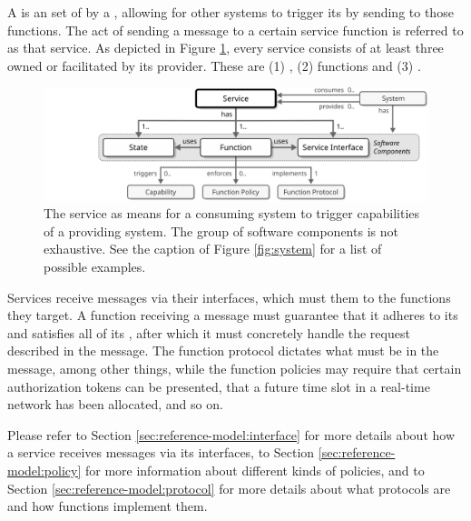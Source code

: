 A  is an  set of   by a , allowing for other systems to trigger its  by sending  to those functions.
The act of sending a message to a certain service function is referred to as  that service.
As depicted in Figure \ref{fig:service}, every service consists of at least three  owned or facilitated by its provider.
These are (1) , (2) functions and (3) .

\begin{figure}[ht!]
  \centering
  \includegraphics[scale=0.9]{figures/service}
  \caption{
    The service as means for a consuming system to trigger capabilities of a providing system.
    The group of software components is not exhaustive.
    See the caption of Figure \ref{fig:system} for a list of possible examples.
  }
  \label{fig:service}
\end{figure}

Services receive messages via their interfaces, which must  them to the functions they target.
A function receiving a message must guarantee that it adheres to its  and satisfies all of its , after which it must concretely handle the request described in the message.
The function protocol dictates what  must be in the message, among other things, while the function policies may require that certain authorization tokens can be presented, that a future time slot in a real-time network has been allocated, and so on.

Please refer to Section \ref{sec:reference-model:interface} for more details about how a service receives messages via its interfaces, to Section \ref{sec:reference-model:policy} for more information about different kinds of policies, and to Section \ref{sec:reference-model:protocol} for more details about what protocols are and how functions implement them.

